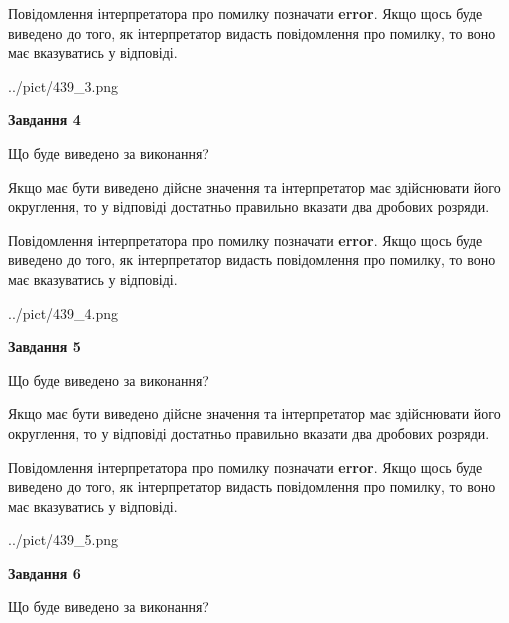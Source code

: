 \documentclass[12pt, ukrainian]{article}
\begin{document}
{\begin {Large}
Повідомлення інтерпретатора про помилку позначати \textbf{error}.
Якщо щось буде виведено до того, як інтерпретатор видасть повідомлення про помилку, 
то воно має вказуватись у відповіді. \par

\begin{center}
	{../pict/439_3.png}
\end{center}
\newpage

{\begin {center}\textbf{Завдання 4}\end {center}}\par
Що буде виведено за виконання? \par

Якщо має бути виведено дійсне значення та інтерпретатор має здійснювати його округлення, 
то у відповіді достатньо правильно вказати два дробових розряди.

Повідомлення інтерпретатора про помилку позначати \textbf{error}.
Якщо щось буде виведено до того, як інтерпретатор видасть повідомлення про помилку, 
то воно має вказуватись у відповіді. \par

\begin{center}
	{../pict/439_4.png}
\end{center}
\newpage

{\begin {center}\textbf{Завдання 5}\end {center}}\par
Що буде виведено за виконання? \par

Якщо має бути виведено дійсне значення та інтерпретатор має здійснювати його округлення, 
то у відповіді достатньо правильно вказати два дробових розряди.

Повідомлення інтерпретатора про помилку позначати \textbf{error}.
Якщо щось буде виведено до того, як інтерпретатор видасть повідомлення про помилку, 
то воно має вказуватись у відповіді. \par

\begin{center}
	{../pict/439_5.png}
\end{center}
\newpage

{\begin {center}\textbf{Завдання 6}\end {center}}\par
Що буде виведено за виконання? \par


\end{Large}}
\end{document}
